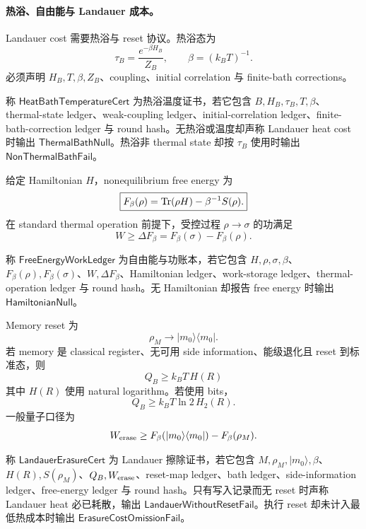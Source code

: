 \paragraph{热浴、自由能与 Landauer 成本。}
Landauer cost 需要热浴与 reset 协议。热浴态为
\[
\boxed{
\tau_B=\frac{e^{-\beta H_B}}{Z_B},
\qquad
\beta=(k_BT)^{-1}.
}
\]
必须声明 \(H_B,T,\beta,Z_B\)、coupling、initial correlation 与 finite-bath corrections。

\begin{definition}[热浴温度证书]\label{def:typed-address-biaxial-completion-heat-bath-temperature-cert}
称 \(\mathsf{HeatBathTemperatureCert}\) 为热浴温度证书，若它包含 \(B,H_B,\tau_B,T,\beta\)、thermal-state ledger、weak-coupling ledger、initial-correlation ledger、finite-bath-correction ledger 与 round hash。无热浴或温度却声称 Landauer heat cost 时输出 \(\mathsf{ThermalBathNull}\)。热浴非 thermal state 却按 \(\tau_B\) 使用时输出 \(\mathsf{NonThermalBathFail}\)。
\end{definition}

给定 Hamiltonian \(H\)，nonequilibrium free energy 为
\[
\boxed{
F_\beta(\rho)={\rm Tr}(\rho H)-\beta^{-1}S(\rho).
}
\]
在 standard thermal operation 前提下，受控过程 \(\rho\to\sigma\) 的功满足
\[
\boxed{
W\ge \Delta F_\beta=F_\beta(\sigma)-F_\beta(\rho).
}
\]

\begin{definition}[自由能与功账本]\label{def:typed-address-biaxial-completion-free-energy-work-ledger}
称 \(\mathsf{FreeEnergyWorkLedger}\) 为自由能与功账本，若它包含 \(H,\rho,\sigma,\beta\)、\(F_\beta(\rho),F_\beta(\sigma)\)、\(W,\Delta F_\beta\)、Hamiltonian ledger、work-storage ledger、thermal-operation ledger 与 round hash。无 Hamiltonian 却报告 free energy 时输出 \(\mathsf{HamiltonianNull}\)。
\end{definition}

Memory reset 为
\[
\rho_M\longrightarrow |m_0\rangle\langle m_0|.
\]
若 memory 是 classical register、无可用 side information、能级退化且 reset 到标准态，则
\[
\boxed{
Q_B\ge k_BT\,H(R)
}
\]
其中 \(H(R)\) 使用 natural logarithm。若使用 bits，
\[
\boxed{
Q_B\ge k_BT\ln2\,H_2(R).
}
\]
一般量子口径为
\[
W_{\rm erase}\ge
F_\beta(|m_0\rangle\langle m_0|)-F_\beta(\rho_M).
\]

\begin{definition}\label{def:typed-address-biaxial-completion-landauer-erasure-cert}
称 \(\mathsf{LandauerErasureCert}\) 为 Landauer 擦除证书，若它包含 \(M,\rho_M,|m_0\rangle,\beta\)、\(H(R),S(\rho_M)\)、\(Q_B,W_{\rm erase}\)、reset-map ledger、bath ledger、side-information ledger、free-energy ledger 与 round hash。只有写入记录而无 reset 时声称 Landauer heat 必已耗散，输出 \(\mathsf{LandauerWithoutResetFail}\)。执行 reset 却未计入最低热成本时输出 \(\mathsf{ErasureCostOmissionFail}\)。
\end{definition}

